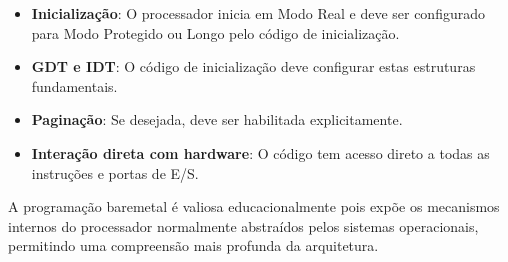 \begin{itemize}
    \item \textbf{Inicialização}: O processador inicia em Modo Real e deve ser configurado para Modo Protegido ou Longo pelo código de inicialização.

    \item \textbf{GDT e IDT}: O código de inicialização deve configurar estas estruturas fundamentais.

    \item \textbf{Paginação}: Se desejada, deve ser habilitada explicitamente.

    \item \textbf{Interação direta com hardware}: O código tem acesso direto a todas as instruções e portas de E/S.
\end{itemize}

A programação baremetal é valiosa educacionalmente pois expõe os mecanismos internos do processador normalmente abstraídos pelos sistemas operacionais, permitindo uma compreensão mais profunda da arquitetura.
